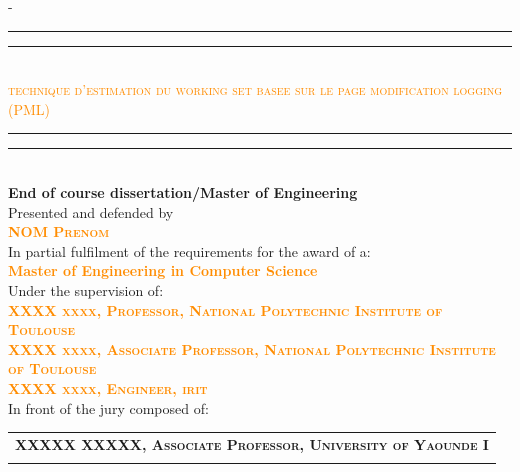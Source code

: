 \begin{titlingpage}
\begin{SingleSpace}
\begin{adjustwidth*}{\unitlength}{-\unitlength}
\vspace{0.3cm}
\begin{center}
\textcolor{darkorange}{\rule[0.5ex]{\linewidth}{2pt}\vspace*{-\baselineskip}\vspace*{2.9pt}}
\textcolor{darkorange}{\rule[0.5ex]{\linewidth}{1pt}}\\[\baselineskip]
{\LARGE {\textcolor{darkorange}{\textsc{ technique d'estimation du working set basee sur le page modification logging (PML) }}
} }\\[2mm]
\textcolor{darkorange}{\rule[0.5ex]{\linewidth}{1pt}\vspace*{-\baselineskip}\vspace{3.2pt}}
\textcolor{darkorange}{\rule[0.5ex]{\linewidth}{2pt}}\\[3mm]
{\Large \textbf{End of course dissertation/Master of Engineering}}\\
\vspace{4mm}
{\Large Presented and defended by } \\
\vspace{4mm}
{\large \textsc{\textbf{\textcolor{darkorange}{NOM Prenom}}}}\\
\vspace{6mm}
{\Large In partial fulfilment of the requirements for the award of a:} \\
\vspace{4mm}
{\large \textbf{\textcolor{darkorange}{Master of Engineering in Computer Science}}}\\
\vspace{4mm}
{\Large Under the supervision of:}\\
\vspace{4mm}
{\normalsize \textsc{\textbf{\textcolor{darkorange}{XXXX xxxx, Professor, National Polytechnic Institute of Toulouse}}}}\\
\vspace{4.5mm}
{\normalsize \textsc{\textbf{\textcolor{darkorange}{XXXX xxxx, Associate Professor, National Polytechnic Institute of Toulouse}}}}\\
\vspace{4.5mm}
{\normalsize \textsc{\textbf{\textcolor{darkorange}{XXXX xxxx, Engineer, \acrlong{irit}}}}} \\
\vspace{4.5mm}
{\Large In front of the jury composed of:} \\
\vspace{4.5mm}
\begin{tabular}{>{\centering\arraybackslash}p{16cm}}
{\Large President:} \textbf{{\large \textsc{XXXXX XXXXX, Associate Professor, University of Yaounde I}}} \\ \\


\end{tabular}
\end{center}
\end{adjustwidth*}
\end{SingleSpace}
\end{titlingpage}

